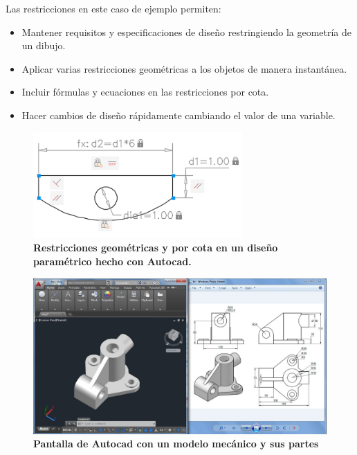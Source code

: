 Las restricciones en este caso de ejemplo permiten:

\begin{itemize}
    \item Mantener requisitos y especificaciones de diseño restringiendo la geometría de un dibujo.
    \item Aplicar varias restricciones geométricas a los objetos de manera instantánea.
    \item Incluir fórmulas y ecuaciones en las restricciones por cota.
    \item Hacer cambios de diseño rápidamente cambiando el valor de una variable.
\end{itemize}



\begin{figure}[h]
\includegraphics[width=8cm]{Img/CPD/autocad-0.png}
\centering
\caption{\textbf{\footnotesize{Restricciones geométricas y por cota en un diseño paramétrico hecho con Autocad.}}}
\label{fig:autocad-0}
\end{figure}

\begin{figure}[h]
\includegraphics[width=14cm]{Img/CPD/autocad.jpg}
\centering
\caption{\textbf{\footnotesize{Pantalla de Autocad con un modelo mecánico y sus partes}}}
\end{figure}


